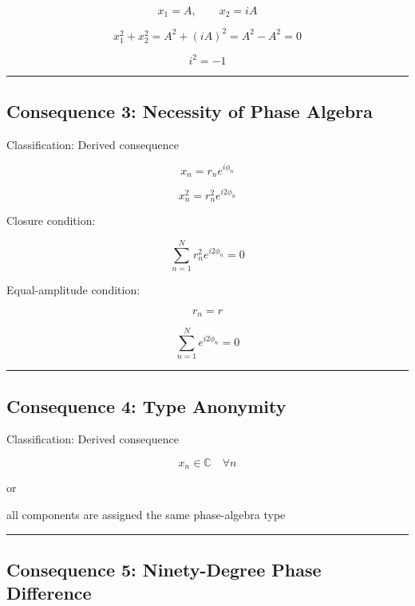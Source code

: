 \documentclass[
  a4paper,
]{article}
\newenvironment{Shaded}{}{}
\newcommand{\NormalTok}[1]{#1}
\begin{document}
\[
x_1=A,\qquad x_2=iA
\]

\[
x_1^2+x_2^2=A^2+(iA)^2=A^2-A^2=0
\]

\[
i^2=-1
\]

\begin{center}\rule{0.5\linewidth}{0.5pt}\end{center}

\subsection{Consequence 3: Necessity of Phase
Algebra}\label{consequence-3-necessity-of-phase-algebra}

Classification: Derived consequence

\[
x_n=r_n e^{i\phi_n}
\]

\[
x_n^2=r_n^2e^{i2\phi_n}
\]

Closure condition:

\[
\sum_{n=1}^{N}r_n^2e^{i2\phi_n}=0
\]

Equal-amplitude condition:

\[
r_n=r
\]

\[
\sum_{n=1}^{N}e^{i2\phi_n}=0
\]

\begin{center}\rule{0.5\linewidth}{0.5pt}\end{center}

\subsection{Consequence 4: Type
Anonymity}\label{consequence-4-type-anonymity}

Classification: Derived consequence

\[
x_n\in\mathbb{C}\quad\forall n
\]

or

\begin{Shaded}
\begin{Highlighting}[]
\NormalTok{all components are assigned the same phase{-}algebra type}
\end{Highlighting}
\end{Shaded}

\begin{center}\rule{0.5\linewidth}{0.5pt}\end{center}

\subsection{Consequence 5: Ninety-Degree Phase
Difference}\label{consequence-5-ninety-degree-phase-difference}
\end{document}
